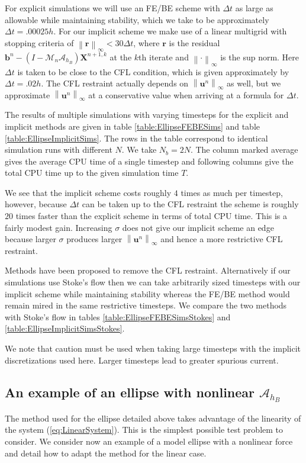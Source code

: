 \documentclass[preprint,12pt]{elsarticle}
\newcommand{\norm}[1]{\left\lVert#1\right\rVert}
\begin{document}
For explicit simulations we will use an FE/BE scheme with $\Delta t$ as large as allowable while maintaining stability, which we take to be approximately $\Delta t = .00025h$. For our implicit scheme we make use of a linear multigrid with stopping criteria of $\norm{\mathbf{r}}_{\infty}<30\Delta t$, where $\mathbf{r}$ is the residual $\mathbf{b}^n-(I-\mathcal{M}_n\mathcal{A}_{h_B})\mathbf{X}^{n+1,k}$ at the $k$th iterate and $\norm{\cdot}_{\infty}$ is the sup norm. Here $\Delta t$ is taken to be close to the CFL condition, which is given approximately by $\Delta t = .02h$. The CFL restraint actually depends on $\norm{\mathbf{u}^n}_{\infty}$ as well, but we approximate $\norm{\mathbf{u}^n}_{\infty}$ at a conservative value when arriving at a formula for $\Delta t$.

The results of multiple simulations with varying timesteps for the explicit and implicit methods are given in table \ref{table:EllipseFEBESims} and table \ref{table:EllipseImplicitSims}. The rows in the table correspond to identical simulation runs with different $N$. We take $N_b = 2N$. The column marked average gives the average CPU time of a single timestep and following columns give the total CPU time up to the given simulation time $T$.

We see that the implicit scheme costs roughly $4$ times as much per timestep, however, because $\Delta t$ can be taken up to the CFL restraint the scheme is roughly $20$ times faster than the explicit scheme in terms of total CPU time. This is a fairly modest gain. Increasing $\sigma$ does not give our implicit scheme an edge because larger $\sigma$ produces larger $\norm{\mathbf{u}^n}_{\infty}$ and hence a more restrictive CFL restraint.

Methods have been proposed to remove the CFL restraint. Alternatively if our simulations use Stoke's flow then we can take arbitrarily sized timesteps with our implicit scheme while maintaining stability whereas the FE/BE method would remain mired in the same restrictive timesteps. We compare the two methods with Stoke's flow in tables \ref{table:EllipseFEBESimsStokes} and \ref{table:EllipseImplicitSimsStokes}.

We note that caution must be used when taking large timesteps with the implicit discretizations used here. Larger timesteps lead to greater spurious current.


\subsection{An example of an ellipse with nonlinear $\mathcal{A}_{h_B}$}
The method used for the ellipse detailed above takes advantage of the linearity of the system (\ref{eq:LinearSystem}). This is the simplest possible test problem to consider. We consider now an example of a model ellipse with a nonlinear force and detail how to adapt the method for the linear case.
\end{document}
